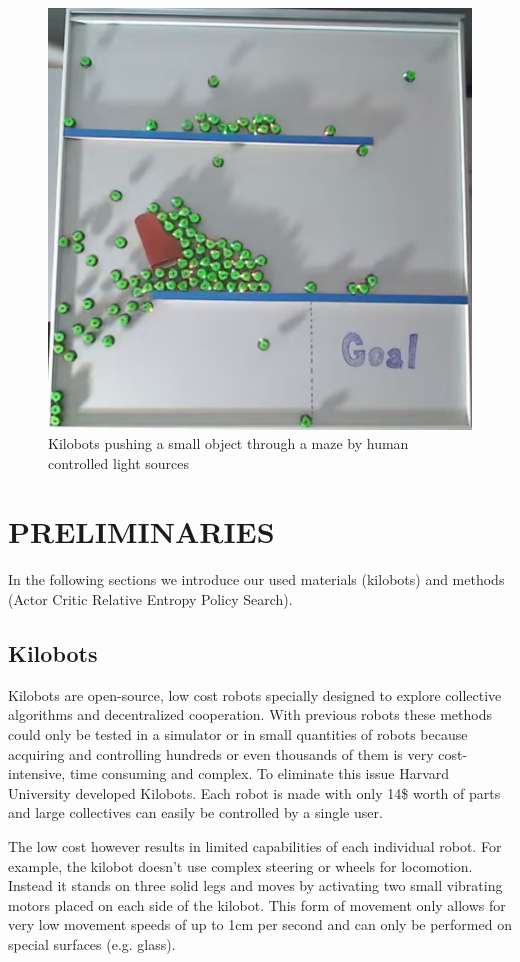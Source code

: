 \documentclass[twoside]{article}
\begin{document}
\begin{figure}[!htb]
    \centering
    \includegraphics[width=0.8\linewidth]{figures/inspiration.png}
    \caption{Kilobots pushing a small object through a maze by human controlled
        light sources}
\end{figure}

\section{PRELIMINARIES}
In the following sections we introduce our used materials
(kilobots\cite{kilobot}) and methods (Actor Critic Relative Entropy Policy
Search)\cite{acreps}.

\subsection{Kilobots}
Kilobots\cite{kilobot} are open-source, low cost robots specially designed to
explore collective algorithms and decentralized cooperation. With previous
robots these methods could only be tested in a simulator or in small quantities
of robots because acquiring and controlling hundreds or even thousands of them
is very cost-intensive, time consuming and complex. To eliminate this issue
Harvard University developed Kilobots. Each robot is made with only 14\$ worth
of parts and large collectives can easily be controlled by a single user.

The low cost however results in limited capabilities of each individual robot.
For example, the kilobot doesn't use complex steering or wheels for locomotion.
Instead it stands on three solid legs and moves by activating two small
vibrating motors placed on each side of the kilobot. This form of movement only
allows for very low movement speeds of up to 1cm per second and can only be
performed on special surfaces (e.g. glass).
\end{document}

